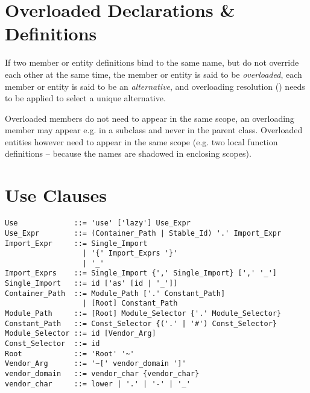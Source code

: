 \section{Overloaded Declarations \& Definitions}
\label{sec:overloaded-definitions}

If two member or entity definitions bind to the same name, but do not override each other at the same time, the member or entity is said to be {\em overloaded}, each member or entity is said to be an {\em alternative}, and overloading resolution () needs to be applied to select a unique alternative. 

Overloaded members do not need to appear in the same scope, an overloading member may appear e.g. in a subclass and never in the parent class. Overloaded entities however need to appear in the same scope (e.g. two local function definitions -- because the names are shadowed in enclosing scopes). 





\section{Use Clauses}
\label{sec:use-clauses}

\syntax\begin{lstlisting}
Use             ::= 'use' ['lazy'] Use_Expr
Use_Expr        ::= (Container_Path | Stable_Id) '.' Import_Expr
Import_Expr     ::= Single_Import
                  | '{' Import_Exprs '}'
                  | '_'
Import_Exprs    ::= Single_Import {',' Single_Import} [',' '_']
Single_Import   ::= id ['as' [id | '_']]
Container_Path  ::= Module_Path ['.' Constant_Path]
                  | [Root] Constant_Path
Module_Path     ::= [Root] Module_Selector {'.' Module_Selector}
Constant_Path   ::= Const_Selector {('.' | '#') Const_Selector}
Module_Selector ::= id [Vendor_Arg]
Const_Selector  ::= id
Root            ::= 'Root' '~'
Vendor_Arg      ::= '~[' vendor_domain ']'
vendor_domain   ::= vendor_char {vendor_char}
vendor_char     ::= lower | '.' | '-' | '_'
\end{lstlisting}


